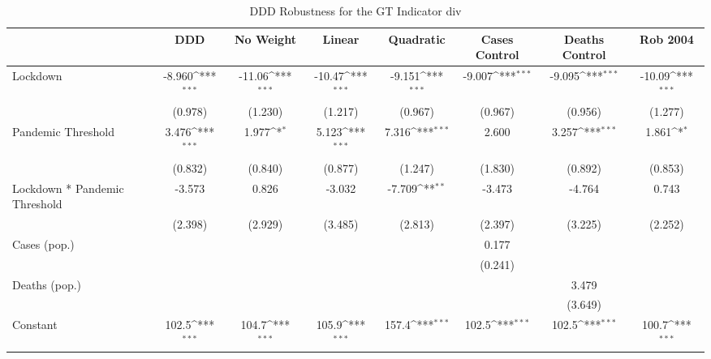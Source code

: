 \documentclass{article}
\begin{document}
{
\def\sym#1{\ifmmode^{#1}\else\(^{#1}\)\fi}
\begin{longtable}{l*{7}{c}}
\caption{DDD Robustness for the GT Indicator div}\\
\hline\hline\endfirsthead\hline\endhead\hline\endfoot\endlastfoot
                &\multicolumn{1}{c}{DDD}&\multicolumn{1}{c}{No Weight}&\multicolumn{1}{c}{Linear}&\multicolumn{1}{c}{Quadratic}&\multicolumn{1}{c}{Cases Control}&\multicolumn{1}{c}{Deaths Control}&\multicolumn{1}{c}{Rob 2004}\\
\hline
Lockdown        &   -8.960\sym{***}&   -11.06\sym{***}&   -10.47\sym{***}&   -9.151\sym{***}&   -9.007\sym{***}&   -9.095\sym{***}&   -10.09\sym{***}\\
                &  (0.978)         &  (1.230)         &  (1.217)         &  (0.967)         &  (0.967)         &  (0.956)         &  (1.277)         \\
Pandemic Threshold&    3.476\sym{***}&    1.977\sym{*}  &    5.123\sym{***}&    7.316\sym{***}&    2.600         &    3.257\sym{***}&    1.861\sym{*}  \\
                &  (0.832)         &  (0.840)         &  (0.877)         &  (1.247)         &  (1.830)         &  (0.892)         &  (0.853)         \\
Lockdown * Pandemic Threshold&   -3.573         &    0.826         &   -3.032         &   -7.709\sym{**} &   -3.473         &   -4.764         &    0.743         \\
                &  (2.398)         &  (2.929)         &  (3.485)         &  (2.813)         &  (2.397)         &  (3.225)         &  (2.252)         \\
Cases (pop.)    &                  &                  &                  &                  &    0.177         &                  &                  \\
                &                  &                  &                  &                  &  (0.241)         &                  &                  \\
Deaths (pop.)   &                  &                  &                  &                  &                  &    3.479         &                  \\
                &                  &                  &                  &                  &                  &  (3.649)         &                  \\
Constant        &    102.5\sym{***}&    104.7\sym{***}&    105.9\sym{***}&    157.4\sym{***}&    102.5\sym{***}&    102.5\sym{***}&    100.7\sym{***}\\

\end{longtable}}
\end{document}
